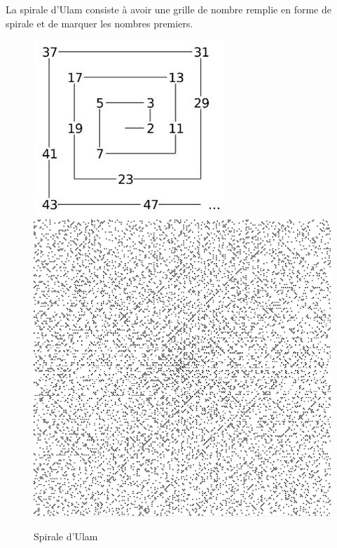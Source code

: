 La spirale d'Ulam consiste à avoir une grille de nombre remplie en forme de spirale et de marquer les nombres premiers.
\begin{figure}[!h]
\begin{center}
\includegraphics[scale=0.8]{images/spirale_explication.jpg}
\includegraphics[scale=0.3]{images/spirale_explication.PNG}
\end{center}
\caption{Spirale d'Ulam}
\end{figure}

